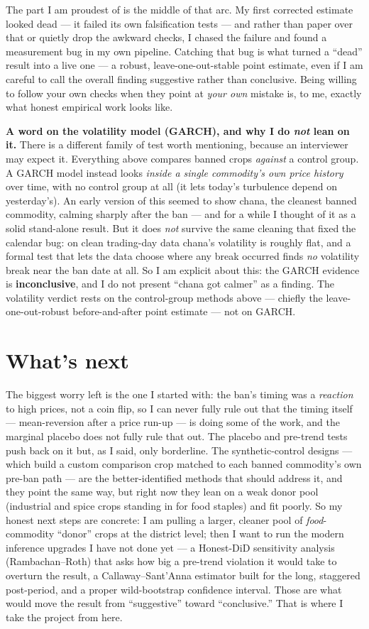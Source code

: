 \documentclass[11pt]{article}
\begin{document}
The part I am proudest of is the middle of that arc. My first corrected estimate looked dead --- it failed its own falsification tests --- and rather than paper over that or quietly drop the awkward checks, I chased the failure and found a measurement bug in my own pipeline. Catching that bug is what turned a ``dead'' result into a live one --- a robust, leave-one-out-stable point estimate, even if I am careful to call the overall finding suggestive rather than conclusive. Being willing to follow your own checks when they point at \emph{your own} mistake is, to me, exactly what honest empirical work looks like.

\textbf{A word on the volatility model (GARCH), and why I do \emph{not} lean on it.} There is a different family of test worth mentioning, because an interviewer may expect it. Everything above compares banned crops \emph{against} a control group. A GARCH model instead looks \emph{inside a single commodity's own price history} over time, with no control group at all (it lets today's turbulence depend on yesterday's). An early version of this seemed to show chana, the cleanest banned commodity, calming sharply after the ban --- and for a while I thought of it as a solid stand-alone result. But it does \emph{not} survive the same cleaning that fixed the calendar bug: on clean trading-day data chana's volatility is roughly flat, and a formal test that lets the data choose where any break occurred finds \emph{no} volatility break near the ban date at all. So I am explicit about this: the GARCH evidence is \textbf{inconclusive}, and I do not present ``chana got calmer'' as a finding. The volatility verdict rests on the control-group methods above --- chiefly the leave-one-out-robust before-and-after point estimate --- not on GARCH.

\section*{What's next}

The biggest worry left is the one I started with: the ban's timing was a \emph{reaction} to high prices, not a coin flip, so I can never fully rule out that the timing itself --- mean-reversion after a price run-up --- is doing some of the work, and the marginal placebo does not fully rule that out. The placebo and pre-trend tests push back on it but, as I said, only borderline. The synthetic-control designs --- which build a custom comparison crop matched to each banned commodity's own pre-ban path --- are the better-identified methods that should address it, and they point the same way, but right now they lean on a weak donor pool (industrial and spice crops standing in for food staples) and fit poorly. So my honest next steps are concrete: I am pulling a larger, cleaner pool of \emph{food}-commodity ``donor'' crops at the district level; then I want to run the modern inference upgrades I have not done yet --- a Honest-DiD sensitivity analysis (Rambachan--Roth) that asks how big a pre-trend violation it would take to overturn the result, a Callaway--Sant'Anna estimator built for the long, staggered post-period, and a proper wild-bootstrap confidence interval. Those are what would move the result from ``suggestive'' toward ``conclusive.'' That is where I take the project from here.
\end{document}
